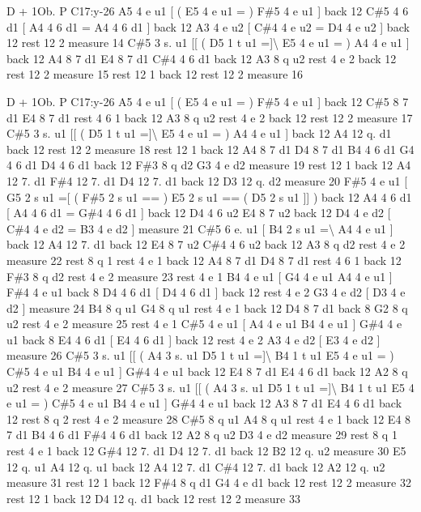 \begin{DoxyItemize}
\item D + 1\+Ob. P C17\+:y-\/26 A5 4 e u1 \mbox{[} ( E5 4 e u1 = ) F\#5 4 e u1 \mbox{]} back 12 C\#5 4 6 d1 \mbox{[} A4 4 6 d1 = A4 4 6 d1 \mbox{]} back 12 A3 4 e u2 \mbox{[} C\#4 4 e u2 = D4 4 e u2 \mbox{]} back 12 rest 12 2 measure 14 C\#5 3 s. u1 \mbox{[}\mbox{[} ( D5 1 t u1 =\mbox{]}\textbackslash{} E5 4 e u1 = ) A4 4 e u1 \mbox{]} back 12 A4 8 7 d1 E4 8 7 d1 C\#4 4 6 d1 back 12 A3 8 q u2 rest 4 e 2 back 12 rest 12 2 measure 15 rest 12 1 back 12 rest 12 2 measure 16
\item D + 1\+Ob. P C17\+:y-\/26 A5 4 e u1 \mbox{[} ( E5 4 e u1 = ) F\#5 4 e u1 \mbox{]} back 12 C\#5 8 7 d1 E4 8 7 d1 rest 4 6 1 back 12 A3 8 q u2 rest 4 e 2 back 12 rest 12 2 measure 17 C\#5 3 s. u1 \mbox{[}\mbox{[} ( D5 1 t u1 =\mbox{]}\textbackslash{} E5 4 e u1 = ) A4 4 e u1 \mbox{]} back 12 A4 12 q. d1 back 12 rest 12 2 measure 18 rest 12 1 back 12 A4 8 7 d1 D4 8 7 d1 B4 4 6 d1 G4 4 6 d1 D4 4 6 d1 back 12 F\#3 8 q d2 G3 4 e d2 measure 19 rest 12 1 back 12 A4 12 7. d1 F\#4 12 7. d1 D4 12 7. d1 back 12 D3 12 q. d2 measure 20 F\#5 4 e u1 \mbox{[} G5 2 s u1 =\mbox{[} ( F\#5 2 s u1 == ) E5 2 s u1 == ( D5 2 s u1 \mbox{]}\mbox{]} ) back 12 A4 4 6 d1 \mbox{[} A4 4 6 d1 = G\#4 4 6 d1 \mbox{]} back 12 D4 4 6 u2 E4 8 7 u2 back 12 D4 4 e d2 \mbox{[} C\#4 4 e d2 = B3 4 e d2 \mbox{]} measure 21 C\#5 6 e. u1 \mbox{[} B4 2 s u1 =\textbackslash{} A4 4 e u1 \mbox{]} back 12 A4 12 7. d1 back 12 E4 8 7 u2 C\#4 4 6 u2 back 12 A3 8 q d2 rest 4 e 2 measure 22 rest 8 q 1 rest 4 e 1 back 12 A4 8 7 d1 D4 8 7 d1 rest 4 6 1 back 12 F\#3 8 q d2 rest 4 e 2 measure 23 rest 4 e 1 B4 4 e u1 \mbox{[} G4 4 e u1 A4 4 e u1 \mbox{]} F\#4 4 e u1 back 8 D4 4 6 d1 \mbox{[} D4 4 6 d1 \mbox{]} back 12 rest 4 e 2 G3 4 e d2 \mbox{[} D3 4 e d2 \mbox{]} measure 24 B4 8 q u1 G4 8 q u1 rest 4 e 1 back 12 D4 8 7 d1 back 8 G2 8 q u2 rest 4 e 2 measure 25 rest 4 e 1 C\#5 4 e u1 \mbox{[} A4 4 e u1 B4 4 e u1 \mbox{]} G\#4 4 e u1 back 8 E4 4 6 d1 \mbox{[} E4 4 6 d1 \mbox{]} back 12 rest 4 e 2 A3 4 e d2 \mbox{[} E3 4 e d2 \mbox{]} measure 26 C\#5 3 s. u1 \mbox{[}\mbox{[} ( A4 3 s. u1 D5 1 t u1 =\mbox{]}\textbackslash{} B4 1 t u1 E5 4 e u1 = ) C\#5 4 e u1 B4 4 e u1 \mbox{]} G\#4 4 e u1 back 12 E4 8 7 d1 E4 4 6 d1 back 12 A2 8 q u2 rest 4 e 2 measure 27 C\#5 3 s. u1 \mbox{[}\mbox{[} ( A4 3 s. u1 D5 1 t u1 =\mbox{]}\textbackslash{} B4 1 t u1 E5 4 e u1 = ) C\#5 4 e u1 B4 4 e u1 \mbox{]} G\#4 4 e u1 back 12 A3 8 7 d1 E4 4 6 d1 back 12 rest 8 q 2 rest 4 e 2 measure 28 C\#5 8 q u1 A4 8 q u1 rest 4 e 1 back 12 E4 8 7 d1 B4 4 6 d1 F\#4 4 6 d1 back 12 A2 8 q u2 D3 4 e d2 measure 29 rest 8 q 1 rest 4 e 1 back 12 G\#4 12 7. d1 D4 12 7. d1 back 12 B2 12 q. u2 measure 30 E5 12 q. u1 A4 12 q. u1 back 12 A4 12 7. d1 C\#4 12 7. d1 back 12 A2 12 q. u2 measure 31 rest 12 1 back 12 F\#4 8 q d1 G4 4 e d1 back 12 rest 12 2 measure 32 rest 12 1 back 12 D4 12 q. d1 back 12 rest 12 2 measure 33

\end{DoxyItemize}
